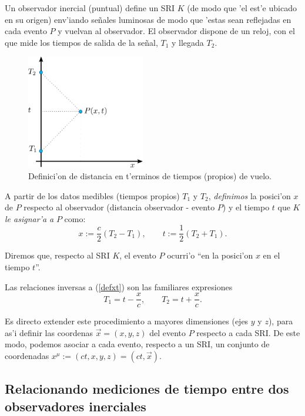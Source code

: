 Un observador inercial (puntual) define un SRI $K$ (de modo que 'el est'e  ubicado en su origen) env'iando se\~nales luminosas de modo que 'estas sean reflejadas en cada evento $P$ y vuelvan al observador. El observador dispone de un reloj,  con el que mide los tiempos de salida de la se\~nal, $T_1$
y llegada $T_2$.
\begin{figure}[!h]
\centerline{\includegraphics[height=5cm]{fig/fig-diagrama-definicion-x-y-t.pdf}}
 \caption{Definici'on de distancia en t'erminos de tiempos (propios) de vuelo.}
\label{defdist}
\end{figure}
A partir de los datos medibles (tiempos propios) $T_1$ y $T_2$, \textit{definimos} la posici'on
$x$ de $P$ respecto al observador (distancia observador - evento $P$) y el
tiempo $t$ que $K$ \textit{le asignar'a a} $P$ como:
\begin{equation}\label{defxt}
\boxed{x:=\frac{c}{2}(T_2-T_1), \qquad t:=\frac{1}{2}(T_2+T_1).}
\end{equation}

Diremos que, respecto al SRI $K$, el evento $P$ ocurri'o ``en la posici'on $x$ en el tiempo $t$''.

Las relaciones inversas a (\ref{defxt}) son las familiares expresiones
\begin{equation}\label{T1T2xt}
T_1=t-\frac{x}{c}, \qquad T_2=t+\frac{x}{c}.
\end{equation}


Es directo extender este procedimiento a mayores dimensiones (ejes $y$ y $z$), para as'i definir las coordenas $\vec{x}=(x,y,z)$ del evento $P$ respecto a cada SRI.
De este modo, podemos asociar a cada evento, respecto a un SRI, un conjunto de
coordenadas $x^\mu:=\left(ct,x,y,z\right)=(ct,\vec{x}) $.


\subsection{Relacionando mediciones de tiempo entre dos observadores inerciales}


